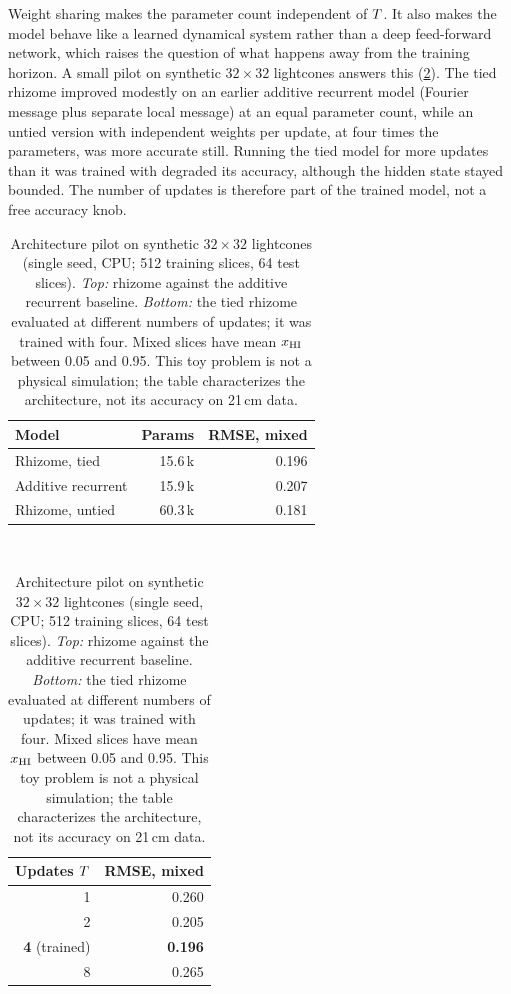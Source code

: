 Weight sharing makes the parameter count independent of $T$. It also makes the model behave like a learned dynamical system rather than a deep feed-forward network, which raises the question of what happens away from the training horizon. A small pilot on synthetic $32\times32$ lightcones answers this (\cref{tab:rhizome-pilot}). The tied rhizome improved modestly on an earlier additive recurrent model (Fourier message plus separate local message) at an equal parameter count, while an untied version with independent weights per update, at four times the parameters, was more accurate still. Running the tied model for more updates than it was trained with degraded its accuracy, although the hidden state stayed bounded. The number of updates is therefore part of the trained model, not a free accuracy knob.

\begin{table}[!htbp]
  \centering
  \caption{Architecture pilot on synthetic $32\times32$ lightcones (single seed, CPU; 512 training slices, 64 test slices). \emph{Top:} rhizome against the additive recurrent baseline. \emph{Bottom:} the tied rhizome evaluated at different numbers of updates; it was trained with four. Mixed slices have mean $x_{\mathrm{HI}}$ between 0.05 and 0.95. This toy problem is not a physical simulation; the table characterizes the architecture, not its accuracy on 21\,cm data.}
  \label{tab:rhizome-pilot}
  \begin{tabular}{lrr}
    \toprule
    Model & Params & RMSE, mixed \\
    \midrule
    Rhizome, tied           & 15.6\,k & 0.196 \\
    Additive recurrent      & 15.9\,k & 0.207 \\
    Rhizome, untied         & 60.3\,k & 0.181 \\
    \bottomrule
  \end{tabular}
  \\[8pt]
  \begin{tabular}{rr}
    \toprule
    Updates $T$ & RMSE, mixed \\
    \midrule
    1 & 0.260 \\
    2 & 0.205 \\
    \textbf{4} (trained) & \textbf{0.196} \\
    8 & 0.265 \\
    \bottomrule
  \end{tabular}
\end{table}

